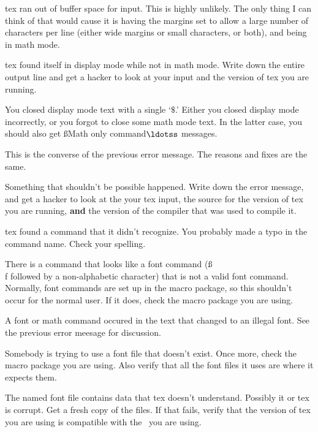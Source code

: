 { tex ran out of buffer space for
input. This is highly unlikely. The only thing I can think of
that would cause it is having the margins set to allow a large
number of characters per line (either wide margins or small
characters, or both), and being in math mode.

 tex found itself in
display mode while not in math mode. Write down the entire output
line and get a hacker to look at your input and the version of
tex you are running.

 You closed display mode
text with a single `$\$$.' Either you closed display mode
incorrectly, or you forgot to close some math mode text. In the
latter case, you should also get {\ss Math only command$\ldotss$}
messages.

 This is the converse of
the previous error message. The reasons and fixes are the same.

 Something that shouldn't be
possible happened. Write down the error message, and get a hacker
to look at the your tex input, the source for the version of tex
you are running, {\bf and} the version of the compiler that was
used to compile it.

 tex found a command that it didn't
recognize. You probably made a typo in the command name. Check
your spelling.

 There is a command that looks like
a font command ({\ss \\f} followed by a non-alphabetic character)
that is not a valid font command. Normally, font commands are set
up in the macro package, so this shouldn't occur for the normal
user. If it does, check the macro package you are using.

 A font or math command occured
in the text that changed to an illegal font. See the previous
error meesage for discussion.

 Somebody is trying to use a font
file that doesn't exist. Once more, check the macro package you
are using. Also verify that all the font files it uses are where
it expects them.

 The named font file contains data that tex
doesn't understand. Possibly it or tex is corrupt. Get a fresh
copy of the files. If that fails, verify that the version of tex
you are using is compatible with the \pfont\ you are using.

}
